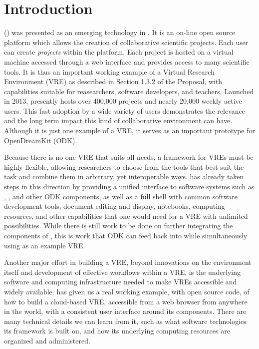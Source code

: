 \documentclass{deliverablereport}
\author{Erik Bray}
\renewcommand{\SMC}{\software{SMC}}
\begin{document}
\maketitle
\strut\githubissuedescription
\newpage\tableofcontents\newpage

\section{Introduction}

 (\SMC) was presented as an emerging technology in
. It is an on-line open source platform which allows
the creation of collaborative scientific projects. Each user can create
\emph{projects} within the platform. Each project is hosted on a \Linux virtual
machine accessed through a web interface and provides access to many scientific
tools.  It is thus an important working example of a Virtual Research
Environment (VRE) as described in Section 1.3.2 of the Proposal, with
capabilities suitable for reasearchers, software developers, and teachers.
Launched in 2013, \SMC presently hosts over 400,000 projects and nearly 20,000
weekly active users. This fast adoption by a wide variety of users demonstrates
the relevance and the long term impact this kind of collaborative environment
can have.  Although it is just one example of a VRE, it serves as an important
prototype for OpenDreamKit (ODK).

Because there is no one VRE that suits all needs, a framework for VREs must be
highly flexible, allowing researchers to choose from the tools that best suit
the task and combine them in arbitrary, yet interoperable ways.  \SMC has
already taken steps in this direction by providing a unified interface to
software systems such as \Sage, \GAP, and other ODK components, as well as a
full \Linux shell with common software development tools, \LATEX document
editing and display, \Jupyter notebooks, computing resources, and other
capabilities that one would need for a VRE with unlimited possibilities.  While
there is still work to be done on further integrating the components of \SMC,
this is work that ODK can feed back into \SMC while simultaneously using \SMC
as an example VRE.

Another major effort in building a VRE, beyond innovations on the environment
itself and development of effective workflows within a VRE, is the underlying
software and computing infrastructure needed to make VREs accessible and widely
available.  \SMC has given us a real working example, with open source code, of
how to build a cloud-based VRE, accessible from a web browser from anywhere in
the world, with a consistent user interface around its components.  There are
many technical details we can learn from it, such as what software technologies
its framework is built on, and how its underlying computing resources are
organized and administered.
\end{document}
